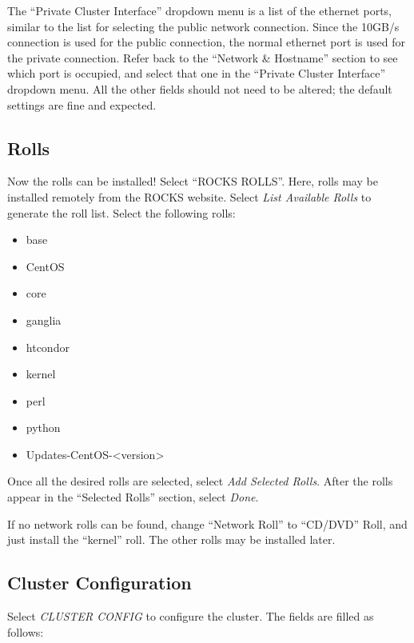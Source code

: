 \documentclass[12pt]{article}
\begin{document}
\qq The ``Private Cluster Interface'' dropdown menu is a list of the ethernet
ports, similar to the list for selecting the public network connection. Since
the 10GB/s connection is used for the public connection, the normal ethernet
port is used for the private connection. Refer back to the ``Network \&
Hostname'' section to see which port is occupied, and select that one in
the ``Private Cluster Interface'' dropdown menu. All the other fields should not
need to be altered; the default settings are fine and expected.

\subsection{Rolls}

\qq Now the rolls can be installed! Select ``ROCKS ROLLS''. Here, rolls may be
installed remotely from the ROCKS website. Select \textit{List Available Rolls}
to generate the roll list. Select the following rolls:

\begin{itemize}
  \item base
  \item CentOS
  \item core
  \item ganglia
  \item htcondor
  \item kernel
  \item perl
  \item python
  \item Updates-CentOS-<version>
\end{itemize}

Once all the desired rolls are selected, select \textit{Add Selected
  Rolls}. After the rolls appear in the ``Selected Rolls'' section, select
\textit{Done}.

\qq If no network rolls can be found, change ``Network Roll'' to ``CD/DVD''
Roll, and just install the ``kernel'' roll. The other rolls may be installed later.

\subsection{Cluster Configuration}

\qq Select \textit{CLUSTER CONFIG} to configure the cluster. The fields are
filled as follows:
\end{document}
